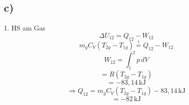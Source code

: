 

\subsection*{c)}
1. HS am Gas
\[
\Delta U_{12} = Q_{12} - W_{12}
\]
\[
m_g C_V (T_{2g} - T_{1g}) \stackrel{!}{=} Q_{12} - W_{12}
\]
\[
W_{12} = \int_{1}^{2} p \, dV
\]
\[
= R (T_{2g} - T_{1g})
\]
\[
= -83,14 \, \text{kJ}
\]
\[
\Rightarrow Q_{12} = m_g C_V (T_{2g} - T_{1g}) - 83,14 \, \text{kJ}
\]
\[
= -82 \, \text{kJ}
\]